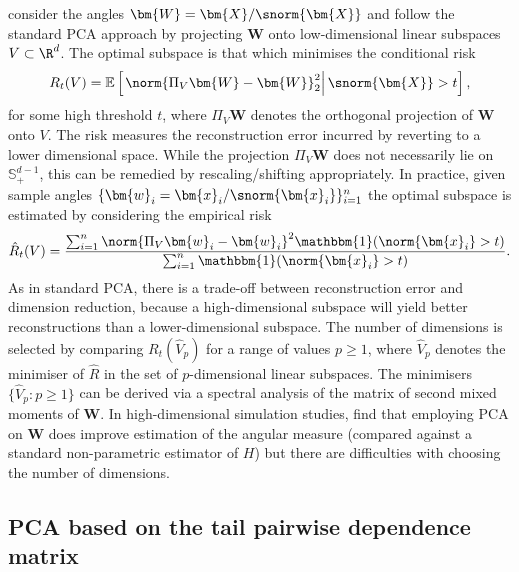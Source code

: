 \documentclass[en-GB, a4paper, nobind]{templates/bathreport}
\begin{document}
\textcite{dreesPrincipalComponentAnalysis2021} consider the angles \(\bm{W}=\bm{X}/\snorm{\bm{X}}\) and follow the standard PCA approach by projecting \(\bm{W}\) onto low-dimensional linear subspaces \(V\subset\R^d\). The optimal subspace is that which minimises the conditional risk
\begin{equation*}
R_t(V) = \mathbb{E}\left[\left.\norm{\Pi_V\bm{W} - \bm{W}}_2^2 \right| \snorm{\bm{X}}>t\right],
\end{equation*}
for some high threshold \(t\), where \(\Pi_V\bm{W}\) denotes the orthogonal projection of \(\bm{W}\) onto \(V\). The risk measures the reconstruction error incurred by reverting to a lower dimensional space. While the projection \(\Pi_V\bm{W}\) does not necessarily lie on \(\mathbb{S}_+^{d-1}\), this can be remedied by rescaling/shifting appropriately. In practice, given sample angles \(\{\bm{w}_i=\bm{x}_i/\snorm{\bm{x}_i}\}_{i=1}^n\) the optimal subspace is estimated by considering the empirical risk
\begin{equation}
\hat{R}_t(V) = \frac{\sum_{i=1}^n \norm{\Pi_V\bm{w}_i - \bm{w}_i}^2\mathbbm{1}(\norm{\bm{x}_i}>t)}{\sum_{i=1}^n \mathbbm{1}(\norm{\bm{x}_i}>t)}.
\label{eq:empirical-risk}
\end{equation}
As in standard PCA, there is a trade-off between reconstruction error and dimension reduction, because a high-dimensional subspace will yield better reconstructions than a lower-dimensional subspace. The number of dimensions is selected by comparing \(R_t(\hat{V}_p)\) for a range of values \(p\geq 1\), where \(\hat{V}_p\) denotes the minimiser of \(\hat{R}\) in the set of \(p\)-dimensional linear subspaces. The minimisers \(\{\hat{V}_p:p\geq 1\}\) can be derived via a spectral analysis of the matrix of second mixed moments of \(\bm{W}\). In high-dimensional simulation studies, \textcite{dreesPrincipalComponentAnalysis2021} find that employing PCA on \(\bm{W}\) does improve estimation of the angular measure (compared against a standard non-parametric estimator of \(H\)) but there are difficulties with choosing the number of dimensions.

\hypertarget{pca-tpdm}{%
\subsection{PCA based on the tail pairwise dependence matrix}\label{pca-tpdm}}
\end{document}
